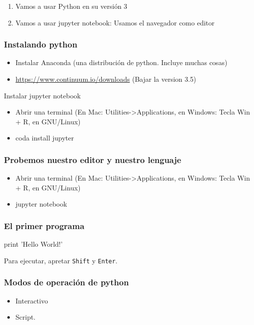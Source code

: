 \begin{frame}
    \begin{enumerate}
        \item Vamos a usar Python  en su versi\'on 3
        \item Vamos a usar jupyter notebook: Usamos el navegador como editor
    \end{enumerate}
\end{frame}

\begin{frame}
    \frametitle{Instalando python}
    \begin{itemize}
        \item Instalar Anaconda (una distribuci\'on de python. Incluye muchas cosas) 
        \item \url{https://www.continuum.io/downloads} (Bajar la version 3.5)
    \end{itemize}
    Instalar jupyter notebook
    \begin{itemize}
        \item Abrir una terminal (En Mac: Utilities->Applications, en Windows: Tecla Win + R, en GNU/Linux)
        \item coda install jupyter
    \end{itemize}
\end{frame}


\begin{frame}
    \frametitle{Probemos nuestro editor y nuestro lenguaje}
    \begin{itemize}
        \item Abrir una terminal (En Mac: Utilities->Applications, en Windows: Tecla Win + R, en GNU/Linux)
        \item jupyter notebook
    \end{itemize}
\end{frame}


\begin{frame}[fragile]
\frametitle{El primer programa}
\begin{python}
    print 'Hello World!'
\end{python}
Para ejecutar, apretar \texttt{Shift} y \texttt{Enter}.
\end{frame}


\begin{frame}
    \frametitle{Modos de operaci\'on de python}
    \begin{itemize}
        \item Interactivo \pause
        \item Script.
    \end{itemize}
\end{frame}

